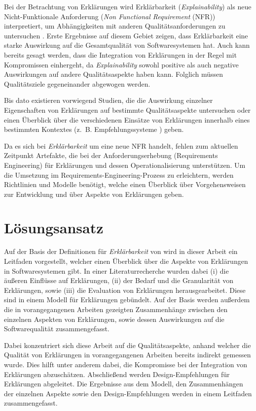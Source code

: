 Bei der Betrachtung von Erklärungen wird Erklärbarkeit (\textit{Explainability}) als neue Nicht-Funktionale Anforderung (\textit{Non Functional Requirement} (NFR)) interpretiert, um Abhängigkeiten mit anderen Qualitätsanforderungen zu untersuchen \cite{kohl_explainability_2019, chazette2020explainability}. Erste Ergebnisse auf diesem Gebiet zeigen, dass Erklärbarkeit eine starke Auswirkung auf die Gesamtqualität von Softwaresystemen hat. Auch kann bereits gesagt werden, dass die Integration von Erklärungen in der Regel mit Kompromissen einhergeht, da \textit{Explainability} sowohl positive als auch negative Auswirkungen auf andere Qualitätsaspekte haben kann. Folglich müssen Qualitätsziele gegeneinander abgewogen werden.

Bis dato existieren vorwiegend Studien, die die Auswirkung einzelner Eigenschaften von Erklärungen auf bestimmte Qualitätsaspekte untersuchen oder einen Überblick über die verschiedenen Einsätze von Erklärungen innerhalb eines bestimmten Kontextes (z.~B. Empfehlungssysteme \cite{nunes_systematic_2017}) geben.

Da es sich bei \textit{Erklärbarkeit} um eine neue NFR handelt, fehlen zum aktuellen Zeitpunkt Artefakte, die bei der Anforderungserhebung (Requirements Engineering) für Erklärungen und dessen Operationalisierung unterstützen. Um die Umsetzung im Requirements-Engineering-Prozess zu erleichtern, werden Richtlinien und Modelle benötigt, welche einen Überblick über Vorgehensweisen zur Entwicklung und über Aspekte von Erklärungen geben. 

\section{Lösungsansatz}

Auf der Basis der Definitionen für \textit{Erklärbarkeit} von \citeauthor[]{chazette_knowledge_nodate} wird in dieser Arbeit ein Leitfaden vorgestellt, welcher einen Überblick über die Aspekte von Erklärungen in Softwaresystemen gibt. In einer Literaturrecherche wurden dabei (i) die äußeren Einflüsse auf Erklärungen, (ii) der Bedarf und die Granularität von Erklärungen, sowie (iii) die Evaluation von Erklärungen herausgearbeitet. Diese sind in einem Modell für Erklärungen gebündelt. Auf der Basis werden außerdem die in vorangegangenen Arbeiten gezeigten Zusammenhänge zwischen den einzelnen Aspekten von Erklärungen, sowie dessen Auswirkungen auf die Softwarequalität zusammengefasst.

Dabei konzentriert sich diese Arbeit auf die Qualitätsaspekte, anhand welcher die Qualität von Erklärungen in vorangegangenen Arbeiten bereits indirekt gemessen wurde. Dies hilft unter anderem dabei, die Kompromisse bei der Integration von Erklärungen abzuschätzen. Abschließend werden  Design-Empfehlungen für Erklärungen abgeleitet. Die Ergebnisse aus dem Modell, den Zusammenhängen der einzelnen Aspekte sowie den Design-Empfehlungen werden in einem Leitfaden zusammengefasst.

